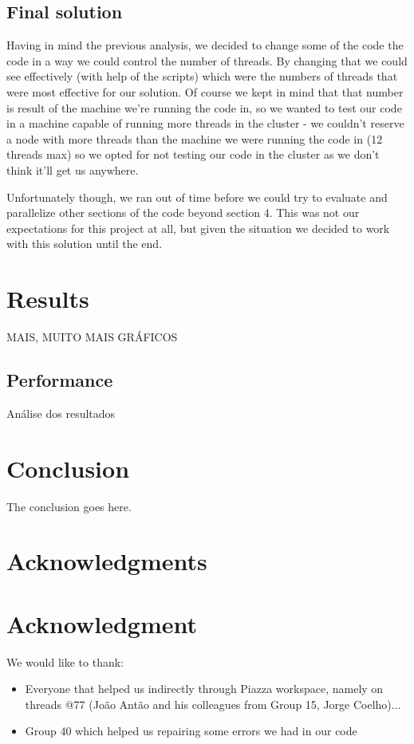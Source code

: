 \documentclass[10pt,journal,compsoc]{IEEEtran}
\begin{document}
\subsection{Final solution}
Having in mind the previous analysis, we decided to change some of the code the code in a way we could control the number of threads. By changing that we could see effectively (with help of the scripts) which were the numbers of threads that were most effective for our solution. Of course we kept in mind that that number is result of the machine we're running the code in, so we wanted to test our code in a machine capable of running more threads in the cluster - we couldn't reserve a node with more threads than the machine we were running the code in (12 threads max) so we opted for not testing our code in the cluster as we don't think it'll get us anywhere.

Unfortunately though, we ran out of time before we could try to evaluate and parallelize other sections of the code beyond section 4. This was not our expectations for this project at all, but given the situation we decided to work with this solution until the end.

\section{Results}
MAIS, MUITO MAIS GRÁFICOS

\subsection{Performance}
Análise dos resultados


\section{Conclusion}
The conclusion goes here.


\ifCLASSOPTIONcompsoc
  \section*{Acknowledgments}
\else
  \section*{Acknowledgment}
\fi


We would like to thank:
\begin{itemize}
    \item Everyone that helped us indirectly through Piazza workspace, namely on threads @77 (João Antão and his colleagues from Group 15, Jorge Coelho)...
    \item Group 40 which helped us repairing some errors we had in our code 
\end{itemize}
\end{document}
